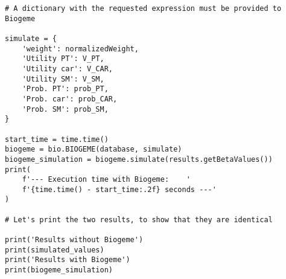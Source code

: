 \documentclass[12pt,a4paper]{article}
\begin{document}
\begin{lstlisting}[style=numbers]
# A dictionary with the requested expression must be provided to Biogeme

simulate = {
    'weight': normalizedWeight,
    'Utility PT': V_PT,
    'Utility car': V_CAR,
    'Utility SM': V_SM,
    'Prob. PT': prob_PT,
    'Prob. car': prob_CAR,
    'Prob. SM': prob_SM,
}

start_time = time.time()
biogeme = bio.BIOGEME(database, simulate)
biogeme_simulation = biogeme.simulate(results.getBetaValues())
print(
    f'--- Execution time with Biogeme:    '
    f'{time.time() - start_time:.2f} seconds ---'
)

# Let's print the two results, to show that they are identical

print('Results without Biogeme')
print(simulated_values)
print('Results with Biogeme')
print(biogeme_simulation)
\end{lstlisting}
\end{document}

